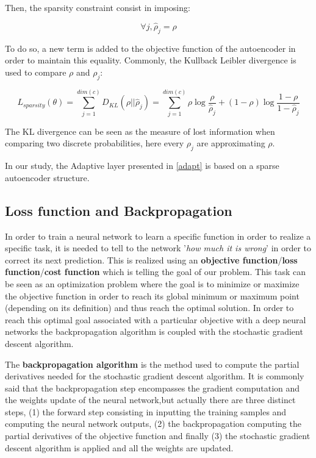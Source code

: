 \documentclass[master, tikz, final,11pt, dvipdfmx]{iscs-thesis}
\begin{document}
Then, the sparsity constraint consist in imposing:

\[
\forall j,  \hat{\rho}_j = \rho
\]

To do so, a new term is added to the objective function of the autoencoder in order to maintain this equality. Commonly, the Kullback Leibler divergence is used to compare $\rho$ and $\rho_j$:

\[
L_{sparsity}(\theta) = \sum_{j=1}^{dim(c)}{D_{KL}(\rho||\hat{\rho}_j)} = \sum_{j=1}^{dim(c)}{\rho\log \frac{\rho}{\hat{\rho}_j}} + (1-\rho)\log \frac{1-\rho}{1-\hat{\rho}_j}
\]

The KL divergence can be seen as the measure of lost information when comparing two discrete probabilities, here every $\rho_j$ are approximating $\rho$.

In our study, the Adaptive layer presented in \autoref{adapt} is based on a sparse autoencoder structure.


\subsection{Loss function and Backpropagation}
\label{loss}

In order to train a neural network to learn a specific function in order to realize a specific task, it is needed to tell to the network '\textit{how much it is wrong}' in order to correct its next prediction. This is realized using an \textbf{objective function}/\textbf{loss function}/\textbf{cost function} which is telling the goal of our problem. This task can be seen as an optimization problem where the goal is to minimize or maximize the objective function in order to reach its global minimum or maximum point (depending on its definition) and thus reach the optimal solution. In order to reach this optimal goal associated with a particular objective with a deep neural networks the backpropagation algorithm is coupled with the stochastic gradient descent algorithm.


The \textbf{backpropagation algorithm} \cite{BACKPROP} is the method used to compute the partial derivatives needed for the stochastic gradient descent algorithm. It is commonly said that the backpropagation step encompasses the gradient computation and the weights update of the neural network,but actually there are three distinct steps, (1) the forward step consisting in inputting the training samples and computing the neural network outputs, (2) the backpropagation computing the partial derivatives of the objective function and finally (3) the stochastic gradient descent algorithm is applied and all the weights are updated.
\end{document}
